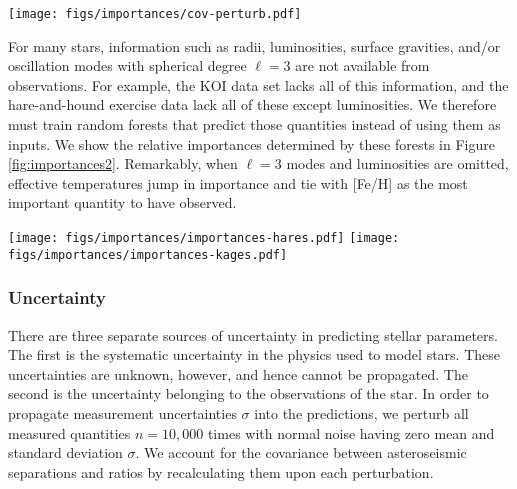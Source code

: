 \documentclass[iop,apj,twocolappendix]{emulateapj}
\begin{document}
\begin{figure*}
    \centering
    \texttt{[image: figs/importances/cov-perturb.pdf]}
    \caption{Standardized covariances of random forest feature importances, with the variables shown in order of median importance. Blue points on the off-diagonal indicate that when the abscissa variable is selected, the ordinate variable is redundant; and conversely, red points indicate that when the abscissa variable is selected, the ordinate variable becomes more useful for successful forecasting.}
    \label{fig:importance-covariances}
\end{figure*}

For many stars, information such as radii, luminosities, surface gravities, and/or oscillation modes with spherical degree $\ell=3$ are not available from observations. For example, the KOI data set lacks all of this information, and the hare-and-hound exercise data lack all of these except luminosities. We therefore must train random forests that predict those quantities instead of using them as inputs. We show the relative importances determined by these forests in Figure \ref{fig:importances2}. Remarkably, when $\ell=3$ modes and luminosities are omitted, effective temperatures jump in importance and tie with [Fe/H] as the most important quantity to have observed. 

\begin{figure*}
    \centering
    \texttt{[image: figs/importances/importances-hares.pdf]}\hfill
    \texttt{[image: figs/importances/importances-kages.pdf]}
    \caption{Box-and-whisker plots of relative importances of each observable feature in measuring fundamental stellar parameters for the hare-and-hound exercise data (left), where luminosities are available; and the Kepler objects-of-interest (right), where they are not. Octupole ($\ell=3$) modes have not been measured in any of these stars, so $\langle\delta\nu_{1,3}\rangle$ and $\langle r_{1,3}\rangle$ from evolutionary modelling are not supplied to these random forests. }
    \label{fig:importances2}
\end{figure*}


\subsubsection{Uncertainty}
\label{sec:uncertainties}
There are three separate sources of uncertainty in predicting stellar parameters. The first is the systematic uncertainty in the physics used to model stars. These uncertainties are unknown, however, and hence cannot be propagated. The second is the uncertainty belonging to the observations of the star. In order to propagate measurement uncertainties $\sigma$ into the predictions, we perturb all measured quantities $n=10,000$ times with normal noise having zero mean and standard deviation $\sigma$. We account for the covariance between asteroseismic separations and ratios by recalculating them upon each perturbation. 
\end{document}
